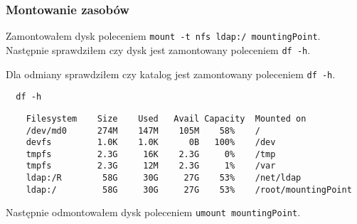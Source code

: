 \documentclass{article} %
\begin{document}
\subsubsection{Montowanie zasobów}
Zamontowałem dysk poleceniem \texttt{mount -t nfs ldap:/ mountingPoint}. Następnie sprawdziłem czy dysk jest zamontowany poleceniem \texttt{df -h}.

Dla odmiany sprawdziłem czy katalog jest zamontowany poleceniem \texttt{df -h}.
\begin{tcolorbox}[colback=yellow!10!white,colframe=red!45!black,coltitle=yellow!100!black, title=FreeBSD]
  \begin{lstlisting}
  df -h
  \end{lstlisting}
  \tcblower
  \tiny
  \begin{lstlisting}
    Filesystem    Size    Used   Avail Capacity  Mounted on
    /dev/md0      274M    147M    105M    58%    /
    devfs         1.0K    1.0K      0B   100%    /dev
    tmpfs         2.3G     16K    2.3G     0%    /tmp
    tmpfs         2.3G     12M    2.3G     1%    /var
    ldap:/R        58G     30G     27G    53%    /net/ldap
    ldap:/         58G     30G     27G    53%    /root/mountingPoint 
  \end{lstlisting}
\end{tcolorbox}
\normalsize

Następnie odmontowałem dysk poleceniem \texttt{umount mountingPoint}.
\end{document}
